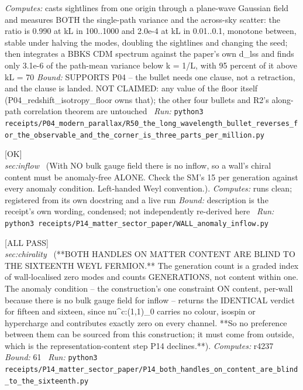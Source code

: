 \begin{description}
\emph{Computes:} casts sightlines from one origin through a plane-wave Gaussian field and measures BOTH the single-path variance and the across-sky scatter: the ratio is 0.990 at kL in 100..1000 and 2.0e-4 at kL in 0.01..0.1, monotone between, stable under halving the modes, doubling the sightlines and changing the seed; then integrates a BBKS CDM spectrum against the paper's own d\_lss and finds only 3.1e-6 of the path-mean variance below k = 1/L, with 95 percent of it above kL = 70
 \emph{Bound:} SUPPORTS P04 -- the bullet needs one clause, not a retraction, and the clause is landed. NOT CLAIMED: any value of the floor itself (P04\_redshift\_isotropy\_floor owns that); the other four bullets and R2's along-path correlation theorem are untouched
\ \emph{Run:} \texttt{python3 receipts/P04\_modern\_parallax/R50\_the\_long\_wavelength\_bullet\_reverses\_for\_the\_observable\_and\_the\_corner\_is\_three\_parts\_per\_million.py}
\item[\label{rcpt:WALL_anomaly_inflow}\texttt{WALL\_anomaly\_inflow}]\hfill\textsf{[OK]}\\
\textit{sec:inflow} \ (With NO bulk gauge field there is no inflow, so a wall's chiral content must be anomaly-free ALONE. Check the SM's 15 per generation against every anomaly condition. Left-handed Weyl convention.). 
\emph{Computes:} runs clean; registered from its own docstring and a live run
 \emph{Bound:} description is the receipt's own wording, condensed; not independently re-derived here
\ \emph{Run:} \texttt{python3 receipts/P14\_matter\_sector\_paper/WALL\_anomaly\_inflow.py}
\item[\label{rcpt:P14_both_handles_on_content_are_blind_to_the_sixteenth}\texttt{P14\_both\_handles\_on\_content\_are\_blind\_to\_the\_sixteenth}]\hfill\textsf{[ALL PASS]}\\
\textit{sec:chirality} \ (**BOTH HANDLES ON MATTER CONTENT ARE BLIND TO THE SIXTEENTH WEYL FERMION.** The generation count is a graded index of wall-localised zero modes and counts GENERATIONS, not content within one. The anomaly condition -- the construction's one constraint ON content, per-wall because there is no bulk gauge field for inflow -- returns the IDENTICAL verdict for fifteen and sixteen, since nu\textasciicircum{}c:(1,1)\_0 carries no colour, isospin or hypercharge and contributes exactly zero on every channel. **So no preference between them can be sourced from this construction; it must come from outside, which is the representation-content step P14 declines.**). 
\emph{Computes:} r4237
 \emph{Bound:} 61
\ \emph{Run:} \texttt{python3 receipts/P14\_matter\_sector\_paper/P14\_both\_handles\_on\_content\_are\_blind\_to\_the\_sixteenth.py}

\end{description}
